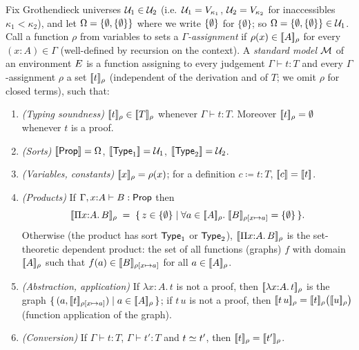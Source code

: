 \begin{definition}
\label{def:model}
Fix Grothendieck universes $\mathcal{U}_1 \in \mathcal{U}_2$ (i.e.\ $\mathcal{U}_1 =
V_{\kappa_1}$, $\mathcal{U}_2 = V_{\kappa_2}$ for inaccessibles $\kappa_1 <
\kappa_2$), and let $\Omega = \{\emptyset, \{\emptyset\}\}$ where we write
$\{\emptyset\}$ for $\{\emptyset\}$; so $\Omega = \{\emptyset, \{\emptyset\}\}
\in \mathcal{U}_1$.  Call a function $\rho$ from variables to sets a
\emph{$\Gamma$-assignment} if $\rho(x) \in [\![ A ]\!]_{\rho}$ for every
$(x{:}A) \in \Gamma$ (well-defined by recursion on the context).  A
\emph{standard model} $\mathcal{M}$ of an environment $E$ is a function
assigning to every judgement $\Gamma \vdash t : T$ and every
$\Gamma$-assignment $\rho$ a set $[\![ t ]\!]_{\rho}$ (independent of the
derivation and of $T$; we omit $\rho$ for closed terms), such that:
\begin{enumerate}[label=(M\arabic*),leftmargin=3.2em]
\item \label{M:typing} \emph{(Typing soundness)}
  $[\![ t ]\!]_{\rho} \in [\![ T ]\!]_{\rho}$ whenever $\Gamma \vdash t : T$.
  Moreover $[\![ t ]\!]_{\rho} = \emptyset$ whenever $t$ is a proof.
\item \label{M:sorts} \emph{(Sorts)}
  $[\![ \mathsf{Prop} ]\!] = \Omega$, $[\![ \mathsf{Type}_1 ]\!] = \mathcal{U}_1$,
  $[\![ \mathsf{Type}_2 ]\!] = \mathcal{U}_2$.
\item \label{M:var} \emph{(Variables, constants)}
  $[\![ x ]\!]_{\rho} = \rho(x)$; for a definition $c \coloneqq t : T$,
  $[\![ c ]\!] = [\![ t ]\!]$.
\item \label{M:pi} \emph{(Products)}
  If $\Gamma, x{:}A \vdash B : \mathsf{Prop}$ then
  \[
    [\![ \Pi x{:}A.\,B ]\!]_{\rho} \;=\;
    \{\,z \in \{\emptyset\} \mid \forall a \in [\![ A ]\!]_{\rho}.\;
        [\![ B ]\!]_{\rho[x \mapsto a]} = \{\emptyset\}\,\} .
  \]
  Otherwise (the product has sort $\mathsf{Type}_1$ or $\mathsf{Type}_2$),
  $[\![ \Pi x{:}A.\,B ]\!]_{\rho}$ is the set-theoretic dependent
  product: the set of all functions (graphs) $f$ with domain
  $[\![ A ]\!]_{\rho}$ such that $f(a) \in [\![ B ]\!]_{\rho[x \mapsto a]}$
  for all $a \in [\![ A ]\!]_{\rho}$.
\item \label{M:lam} \emph{(Abstraction, application)}
  If $\lambda x{:}A.\,t$ is not a proof, then
  $[\![ \lambda x{:}A.\,t ]\!]_{\rho}$ is the graph
  $\{\,(a, [\![ t ]\!]_{\rho[x \mapsto a]}) \mid a \in [\![ A ]\!]_{\rho}\,\}$;
  if $t\,u$ is not a proof, then
  $[\![ t\,u ]\!]_{\rho} = [\![ t ]\!]_{\rho}\bigl([\![ u ]\!]_{\rho}\bigr)$
  (function application of the graph).
\item \label{M:conv} \emph{(Conversion)}
  If $\Gamma \vdash t : T$, $\Gamma \vdash t' : T$ and $t \simeq t'$,
  then $[\![ t ]\!]_{\rho} = [\![ t' ]\!]_{\rho}$.

\end{enumerate}
\end{definition}
